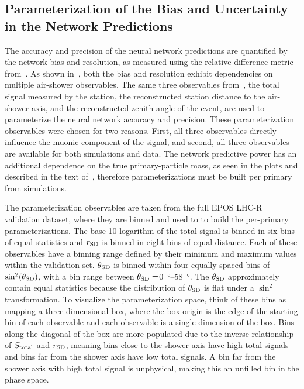 \subsection{Parameterization of the Bias and Uncertainty in the Network Predictions}\label{ssec:parameterization}
The accuracy and precision of the neural network predictions are quantified by the network bias and resolution, as measured using the relative difference metric from~.
As shown in~, both the bias and resolution exhibit dependencies on multiple air-shower observables.
The same three observables from~, the total signal measured by the station, the reconstructed station distance to the air-shower axis, and the reconstructed zenith angle of the event, are used to parameterize the neural network accuracy and precision.
These parameterization observables were chosen for two reasons.
First, all three observables directly influence the muonic component of the signal, and second, all three observables are available for both simulations and data.
The network predictive power has an additional dependence on the true primary-particle mass, as seen in the plots and described in the text of~, therefore parameterizations must be built per primary from simulations.

The parameterization observables are taken from the full EPOS LHC-R validation dataset, where they are binned and used to to build the per-primary parameterizations.
The base-10 logarithm of the total signal is binned in six bins of equal statistics and $r_{\rm SD}$ is binned in eight bins of equal distance.
Each of these observables have a binning range defined by their minimum and maximum values within the validation set.
$\theta_{\rm SD}$ is binned within four equally spaced bins of $\sin^{2}(\theta_{\rm SD})$, with a bin range between $\theta_{\rm SD}=$\qtyrange{0}{58}{\degree}.
The $\theta_{\rm SD}$ approximately contain equal statistics because the distribution of $\theta_{\rm SD}$ is flat under a $\sin^{2}$ transformation.
To visualize the parameterization space, think of these bins as mapping a three-dimensional box, where the box origin is the edge of the starting bin of each observable and each observable is a single dimension of the box.
Bins along the diagonal of the box are more populated due to the inverse relationship of $S_{\rm total}$ and $r_{\rm SD}$, meaning bins close to the shower axis have high total signals and bins far from the shower axis have low total signals.
A bin far from the shower axis with high total signal is unphysical, making this an unfilled bin in the phase space.


